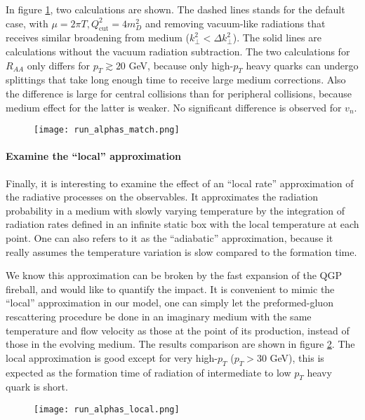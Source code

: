 In figure \ref{fig:new:run-match}, two calculations are shown. 
The dashed lines stands for the default case, with $\mu=2\pi T, Q_{\textrm{cut}}^2=4m_D^2$ and removing vacuum-like radiations that receives similar broadening from medium ($k_\perp^2 < \Delta k_\perp^2$).
The solid lines are calculations without the vacuum radiation subtraction.
The two calculations for $R_{AA}$ only differs for $p_T\gtrsim 20$ GeV, because only high-$p_T$ heavy quarks can undergo splittings that take long enough time to receive large medium corrections.
Also the difference is large for central collisions than for peripheral collisions, because medium effect for the latter is weaker.
No significant difference is observed for $v_n$.

\begin{figure}
\centering
\texttt{[image: run\_alphas\_match.png]}
\caption{}
\label{fig:new:run-match}
\end{figure}

\paragraph{Examine the ``local'' approximation}
Finally, it is interesting to examine the effect of an ``local rate'' approximation of the radiative processes on the observables.
It approximates the radiation probability in a medium with slowly varying temperature by the integration of radiation rates defined in an infinite static box with the local temperature at each point.
One can also refers to it as the ``adiabatic'' approximation, because it really assumes the temperature variation is slow compared to the formation  time.

We know this approximation can be broken by the fast expansion of the QGP fireball, and would like to quantify the impact.
It is convenient to mimic the ``local'' approximation in our model, one can simply let the preformed-gluon rescattering procedure be done in an imaginary medium with the same temperature and flow velocity as those at the point of its production, instead of those in the evolving medium.
The results comparison are shown in figure \ref{fig:new:run-local}.
The local approximation is good except for very high-$p_T$ ($p_T > 30$ GeV), this is expected as the formation time of radiation of intermediate to low $p_T$ heavy quark is short.


\begin{figure}
\centering
\texttt{[image: run\_alphas\_local.png]}
\caption{}
\label{fig:new:run-local}
\end{figure}
